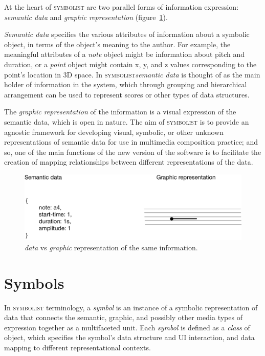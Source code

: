 \documentclass{article}
\def\symbolist{\textsc{symbolist}\xspace}
\begin{document}
At the heart of \symbolist are two parallel forms of information expression: \textit{semantic data} and \textit{graphic representation} (figure~\ref{fig:graphic-representation}).

\textit{Semantic data} specifies the various attributes of information about a symbolic object, in terms of the object's meaning to the author. 
For example, the meaningful attributes of a \textit{note} object might be information about pitch and duration, or a \textit{point} object might contain x, y, and z values corresponding to the point's location in 3D space. In \symbolist \textit{semantic data} is thought of as the main holder of information in the system, which through grouping and hierarchical arrangement can be used to represent scores or other types of data structures.

The \textit{graphic representation} of the information is a visual expression of the semantic data, which is open in nature. The aim of \symbolist is to provide an agnostic framework for developing visual, symbolic, or other unknown representations of semantic data for use in multimedia composition practice; and so, one of the main functions of the new version of the software is to facilitate the creation of mapping relationships between different representations of the data.


\begin{figure}[ht!]
\centering
\includegraphics[width=1\columnwidth]{graphic-representation.pdf}
\caption{\textit{data} vs \textit{graphic} representation of the same information.
\label{fig:graphic-representation}}
\end{figure}



\section{Symbols}\label{sec:symbols}

In \symbolist terminology, a \textit{symbol} is an instance of a symbolic representation of data that connects the semantic, graphic, and possibly other media types of expression together as a multifaceted unit.
Each \textit{symbol} is defined as a \textit{class} of object, which specifies the symbol's data structure and UI interaction, and data mapping to different representational contexts.
\end{document}
